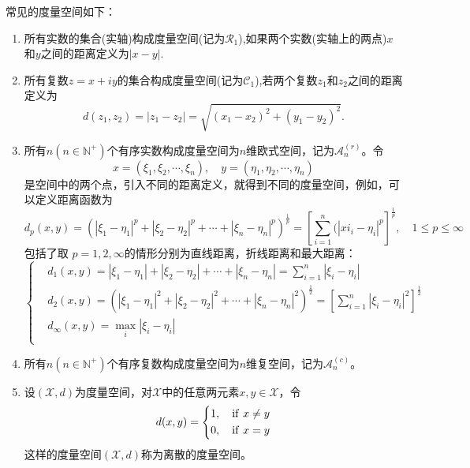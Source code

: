 	\begin{example}
		常见的度量空间如下：
		\begin{enumerate}
		\item 
			所有实数的集合(实轴)构成度量空间(记为$\mathscr{R}_1$),如果两个实数(实轴上的两点)$x$和$y$之间的距离定义为$|x-y|$.
		\item 
			所有复数$z = x+iy$的集合构成度量空间(记为$\mathscr{C}_1$),若两个复数$z_1$和$z_2$之间的距离定义为
			$$ d(z_1,z_2) = |z_1-z_2| = \sqrt{(x_1-x_2)^2+(y_1-y_2)^2}.$$
			\item 所有$n(n\in \mathbb{N^+})$个有序实数构成度量空间为$n$维欧式空间，记为$\mathscr{A}^{(r)}_{n}$。令
			$$x = (\xi_1,\xi_2,\cdots,\xi_n), \quad y = (\eta_1,\eta_2,\cdots,\eta_n)$$
			是空间中的两个点，引入不同的距离定义，就得到不同的度量空间，例如，可以定义距离函数为
			\begin{equation}
				d_p(x,y) = (|\xi_1-\eta_1|^p+|\xi_2-\eta_2|^p+\cdots+|\xi_n-\eta_n|^p)^{\frac{1}{p}} = [\sum_{i=1}^{n}(|xi_i-\eta_i|^p]^{\frac{1}{p}},\quad 1\le p\le \infty
			\end{equation}
			包括了取 $p = 1,2,\infty$的情形分别为直线距离，折线距离和最大距离：
			\begin{equation}
			\left\{  
			\begin{aligned}
			{}&d_1(x,y) = |\xi_1-\eta_1|+|\xi_2-\eta_2|+\cdots+|\xi_n-\eta_n| = \sum_{i=1}^{n}|\xi_i-\eta_i|\\
			{}&d_2(x,y) = (|\xi_1-\eta_1|^2+|\xi_2-\eta_2|^2+\cdots+|\xi_n-\eta_n|^2)^{\frac{1}{2}} = [\sum_{i=1}^{n}|\xi_i-\eta_i|^2]^{\frac{1}{2}}\\
			{}&d_\infty(x,y) = \max_i|\xi_i-\eta_i|\\
			\end{aligned}
			\right. 
			\end{equation}
		\item 
			所有$n(n\in \mathbb{N^+})$个有序复数构成度量空间为$n$维复空间，记为$\mathscr{A}^{(c)}_{n}$。
		\item 设$(\mathscr{X},d)$为度量空间，对$\mathscr{X}$中的任意两元素$x,y \in \mathscr{X}$，令
				\begin{equation}
					d(x,y)  = \left\{ 
					\begin{aligned}
					{}&1,\quad {\rm if ~}  x \neq y\\
					{}&0,\quad {\rm if ~}  x = y\\
					\end{aligned}
					\right. 
				\end{equation}
			这样的度量空间$(\mathscr{X},d)$称为离散的度量空间。

\end{enumerate}
\end{example}
